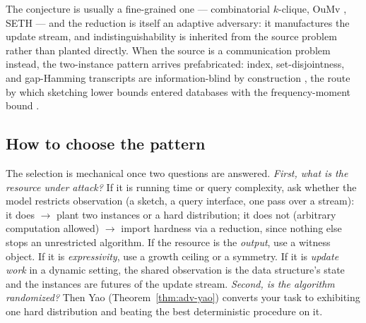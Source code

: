 The conjecture is usually a fine-grained one --- combinatorial $k$-clique, OuMv
\citep{adversarial-construction-bg5}, SETH --- and the reduction is itself an adaptive
adversary: it manufactures the update stream, and indistinguishability is inherited from the
source problem rather than planted directly. When the source is a communication problem
instead, the two-instance pattern arrives prefabricated: index, set-disjointness, and
gap-Hamming transcripts are information-blind by construction
\citep{adversarial-construction-bg2}, the route by which sketching lower bounds entered
databases with the frequency-moment bound \citep{adversarial-construction-bg3}.

\subsection{How to choose the pattern}
\label{sec:adv-choose}

The selection is mechanical once two questions are answered. \emph{First, what is the resource
under attack?} If it is running time or query complexity, ask whether the model restricts
observation (a sketch, a query interface, one pass over a stream): it does $\to$ plant two
instances or a hard distribution; it does not (arbitrary computation allowed) $\to$ import
hardness via a reduction, since nothing else stops an unrestricted algorithm. If the resource
is the \emph{output}, use a witness object. If it is \emph{expressivity}, use a growth ceiling
or a symmetry. If it is \emph{update work} in a dynamic setting, the shared observation is the
data structure's state and the instances are futures of the update stream.
\emph{Second, is the algorithm randomized?} Then Yao
(Theorem~\ref{thm:adv-yao}) converts your task to exhibiting one hard distribution and beating
the best deterministic procedure on it.

